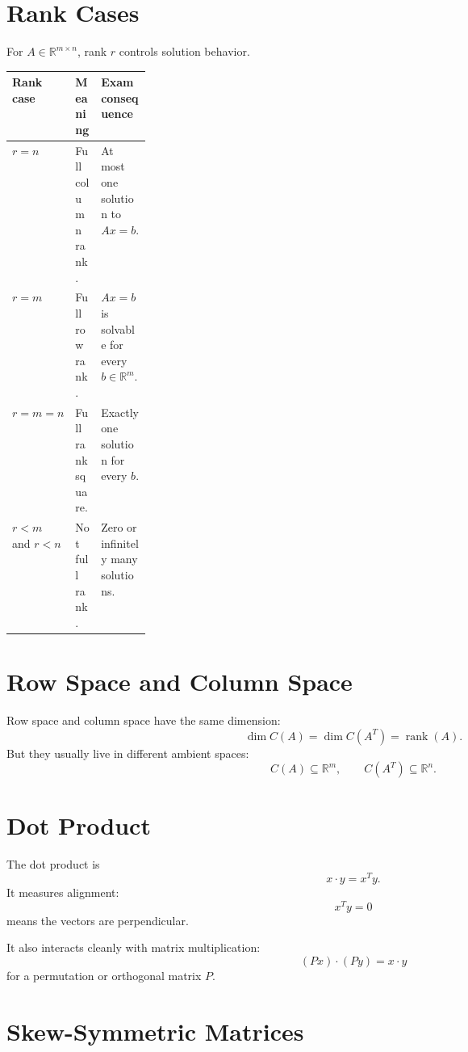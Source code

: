 \documentclass[10pt]{article}
\begin{document}
\section{Rank Cases}

For \(A\in\mathbb{R}^{m\times n}\), rank \(r\) controls solution behavior.

\begin{center}
\small
\begin{tabularx}{\linewidth}{@{}L{0.20\linewidth}Y Y@{}}
\toprule
Rank case & Meaning & Exam consequence \\
\midrule
\(r=n\) & Full column rank. & At most one solution to \(Ax=b\). \\
\(r=m\) & Full row rank. & \(Ax=b\) is solvable for every \(b\in\mathbb{R}^m\). \\
\(r=m=n\) & Full rank square. & Exactly one solution for every \(b\). \\
\(r<m\) and \(r<n\) & Not full rank. & Zero or infinitely many solutions. \\
\bottomrule
\end{tabularx}
\end{center}

\section{Row Space and Column Space}

Row space and column space have the same dimension:
\[
\dim C(A)=\dim C(A^{T})=\operatorname{rank}(A).
\]
But they usually live in different ambient spaces:
\[
C(A)\subseteq\mathbb{R}^{m},
\qquad
C(A^{T})\subseteq\mathbb{R}^{n}.
\]


\section{Dot Product}

The dot product is
\[
x\cdot y=x^{T}y.
\]
It measures alignment:
\[
x^{T}y=0
\]
means the vectors are perpendicular.

It also interacts cleanly with matrix multiplication:
\[
(Px)\cdot(Py)=x\cdot y
\]
for a permutation or orthogonal matrix \(P\).

\section{Skew-Symmetric Matrices}
\end{document}

